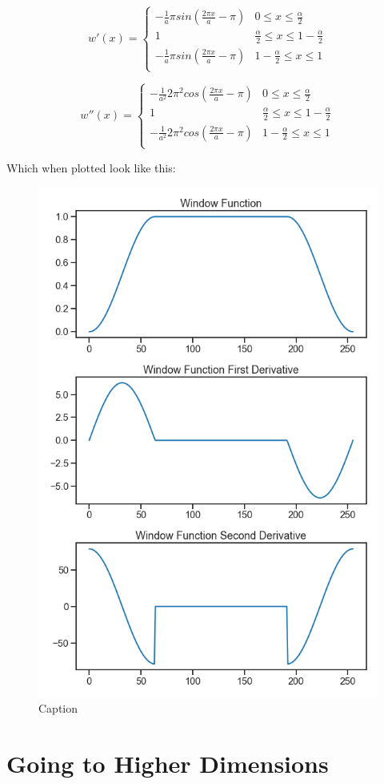 \documentclass[a4paper, 12pt]{article}
\begin{document}
$$ w'(x)=   \left\{
\begin{array}{ll}
      - \frac{1}{a}\pi sin(\frac{2 \pi x}{a} - \pi) & 0 \leq x \leq \frac{\alpha}{2} \\
      1 & \frac{\alpha}{2} \leq x \leq 1 - \frac{\alpha}{2} \\
      - \frac{1}{a}\pi sin(\frac{2 \pi x}{a} - \pi) & 1 - \frac{\alpha}{2} \leq x \leq 1 \\
\end{array}
\right.  $$

$$ w''(x)=   \left\{
\begin{array}{ll}
      - \frac{1}{a^2}2 \pi^2 cos(\frac{2 \pi x}{a} - \pi) & 0 \leq x \leq \frac{\alpha}{2} \\
      1 & \frac{\alpha}{2} \leq x \leq 1 - \frac{\alpha}{2} \\
      - \frac{1}{a^2}2 \pi^2 cos(\frac{2 \pi x}{a} - \pi) & 1 - \frac{\alpha}{2} \leq x \leq 1 \\
\end{array}
\right.  $$

Which when plotted look like this:

\begin{figure}[H]
    \centering
    \includegraphics[scale = 0.5]{window.PNG}
    \caption{Caption}
    \label{fig:my_label}
\end{figure}

\section{Going to Higher Dimensions}
\end{document}
